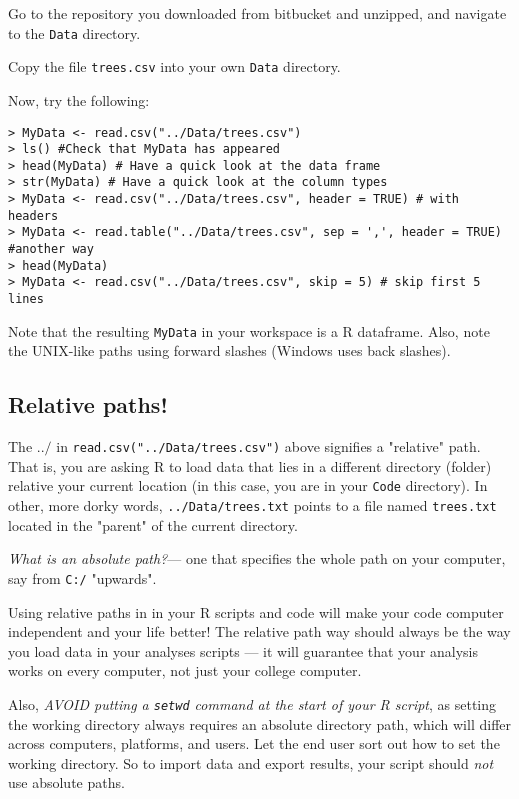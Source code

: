 \begin{compactitem}[$\quad\star$]
	\item Go to the repository you downloaded from bitbucket and 
	unzipped, and navigate to the {\tt Data} directory. 
	\item Copy the file {\tt trees.csv} into your own {\tt Data} 
	directory.
	\item Now, try the following:
\end{compactitem}
\begin{lstlisting}
> MyData <- read.csv("../Data/trees.csv")
> ls() #Check that MyData has appeared 
> head(MyData) # Have a quick look at the data frame
> str(MyData) # Have a quick look at the column types
> MyData <- read.csv("../Data/trees.csv", header = TRUE) # with headers
> MyData <- read.table("../Data/trees.csv", sep = ',', header = TRUE) #another way
> head(MyData)
> MyData <- read.csv("../Data/trees.csv", skip = 5) # skip first 5 lines
\end{lstlisting}

Note that the resulting {\tt MyData} in your workspace is a R 
dataframe. Also, note the UNIX-like paths using forward slashes (Windows uses 
back slashes). 

\subsection{Relative paths!} 

The $../$ in {\tt read.csv("../Data/trees.csv")} above signifies a 
"relative" path. That is, you are asking R to load data that lies in a 
different directory (folder) relative your current location (in this 
case, you are in your {\tt Code} directory). In other, more dorky 
words, {\tt ../Data/trees.txt} points to a file named {\tt trees.txt} 
located in the "parent" of the current directory.

{\it What is an absolute path?}--- one that specifies the whole path on 
your computer, say from {\tt C:/} "upwards".  

Using relative paths in in your R scripts and code will make your code 
computer independent and your life better! The relative path way should 
always be the way you load data in your analyses scripts --- it will 
guarantee that your analysis works on every computer, not just your 
college computer. 

Also, {\it AVOID putting a {\tt setwd} command at the start of your R 
script}, as setting the working directory always requires an absolute 
directory path, which will differ across computers, platforms, and 
users. Let the end user sort out how to set the working directory. So 
to import data and export results, your script should {\it not} use 
absolute paths.  

